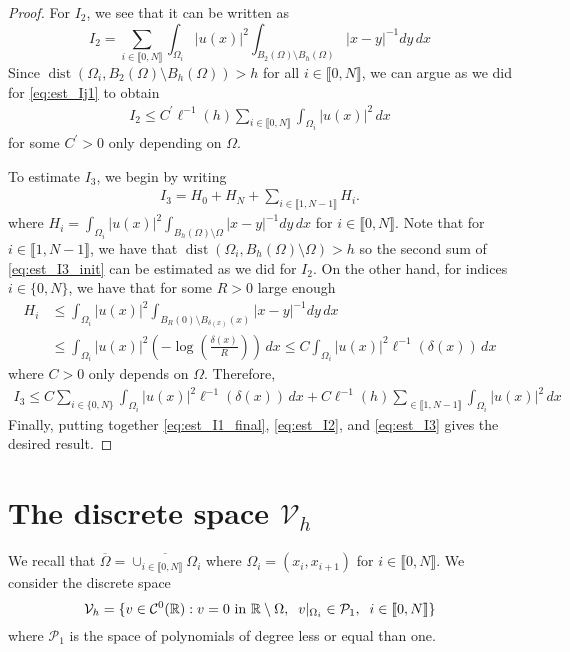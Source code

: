 \documentclass[11 pt]{article}
\newcommand\inter[1]{\llbracket #1\rrbracket}
\numberwithin{equation}{section}
\def\dist{\operatorname{dist}}
\def\R{\mathbb{R}}
\begin{document}
\begin{proof}
For $I_2$, we see that it can be written as
%
\begin{equation}
    I_2=\sum_{i\in\inter{0,N}}\int_{\Omega_i}|u(x)|^2\int_{B_2(\Omega)\setminus B_{h}(\Omega)}|x-y|^{-1}dy\,dx
\end{equation}
%
Since $\dist(\Omega_i,B_2(\Omega)\setminus B_h(\Omega))>h$ for all $i\in\inter{0,N}$, we can argue as we did for \eqref{eq:est_Ij1} to obtain 
%
\begin{align}\label{eq:est_I2}
    I_2\leq C^\prime\ell^{-1}(h)\sum_{i\in\inter{0,N}}\int_{\Omega_i}|u(x)|^2\,dx
\end{align}
%
for some $C^\prime>0$ only depending on $\Omega$.

To estimate $I_3$, we begin by writing
%
\begin{align}\label{eq:est_I3_init}
    I_3=H_0+H_N+\sum_{i\in\inter{1,N-1}}H_i.
\end{align}
%
where $H_i=\int_{\Omega_i}|u(x)|^2\int_{B_h(\Omega)\setminus \Omega}|x-y|^{-1}dy\,dx$ for $i\in\inter{0,N}$. Note that for $i\in\inter{1,N-1}$, we have that $\dist(\Omega_i,B_h(\Omega)\setminus\Omega)>h$ so the second sum of \eqref{eq:est_I3_init} can be estimated as we did for $I_2$. On the other hand, for indices $i\in\{0,N\}$, we have that for some $R>0$ large enough
%
\begin{align*}
    H_i&\leq \int_{\Omega_i}|u(x)|^2\int_{B_R(0)\setminus B_{\delta(x)}(x)}|x-y|^{-1}dy\,dx \\
    &\leq \int_{\Omega_i}|u(x)|^2\left(-\log\left(\tfrac{\delta(x)}{R}\right)\right)\,dx \leq C \int_{\Omega_i}|u(x)|^2\ell^{-1}(\delta(x))\,dx
\end{align*}
%
where $C>0$ only depends on $\Omega$. Therefore,
%
\begin{align}\label{eq:est_I3}
    I_3\leq C \sum_{i\in\{0,N\}}\int_{\Omega_i}|u(x)|^2\ell^{-1}(\delta(x))\,dx + C\ell^{-1}(h)\sum_{\in\inter{1,N-1}}\int_{\Omega_i}|u(x)|^2\,dx
\end{align}
%
Finally, putting together \eqref{eq:est_I1_final}, \eqref{eq:est_I2}, and \eqref{eq:est_I3} gives the desired result. 
%
\end{proof}

\section{The discrete space $\mathcal V_h$}

We recall that $\overline{\Omega}=\overline{\cup_{i\in\inter{0,N}}\Omega_i}$ where $\Omega_i=(x_i,x_{i+1})$ for $i\in\inter{0,N}$. We consider the discrete space
%
\begin{equation}
    \mathcal V_h=\{v\in \mathcal C^0(\R): v=0 \textnormal{ in } \R\setminus \Omega, \;\; v|_{\Omega_i}\in \mathcal P_1, \;\;  i\in\inter{0,N}\}
\end{equation}
%
where $\mathcal P_1$ is the space of polynomials of degree less or equal than one. 
\end{document}
